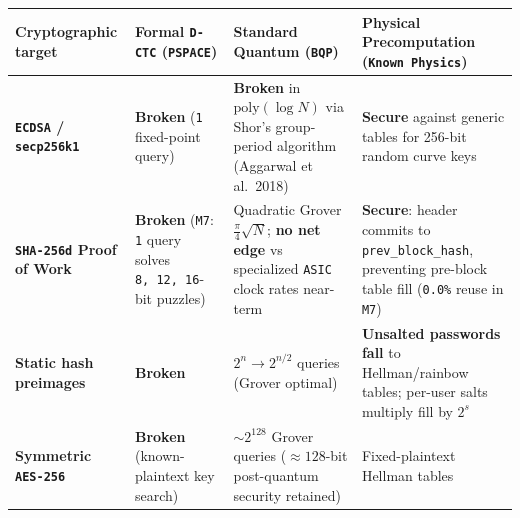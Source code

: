 \documentclass[10pt,letterpaper]{article}
\newcounter{none}
\begin{document}
{\def\LTcaptype{none} %
{\footnotesize\setlength{\tabcolsep}{3.8pt}\renewcommand{\arraystretch}{1.15}
\begin{longtable}[]{@{}
  >{\raggedright\arraybackslash}p{}
  >{\raggedright\arraybackslash}p{}
  >{\raggedright\arraybackslash}p{}
  >{\raggedright\arraybackslash}p{}@{}}
\toprule\noalign{}
\begin{minipage}[b]{\linewidth}\raggedright
\textbf{Cryptographic target}
\end{minipage} & \begin{minipage}[b]{\linewidth}\raggedright
\textbf{Formal \texttt{D-CTC} (\texttt{PSPACE})}
\end{minipage} & \begin{minipage}[b]{\linewidth}\raggedright
\textbf{Standard Quantum (\texttt{BQP})}
\end{minipage} & \begin{minipage}[b]{\linewidth}\raggedright
\textbf{Physical Precomputation (\texttt{Known\ Physics})}
\end{minipage} \\
\midrule\noalign{}
\endhead
\bottomrule\noalign{}
\endlastfoot
\textbf{\texttt{ECDSA} / \texttt{secp256k1}} & \textbf{Broken}
(\texttt{1} fixed-point query) & \textbf{Broken} in
\(\mathrm{poly}(\log N)\) via Shor's group-period algorithm (Aggarwal et
al.~2018) & \textbf{Secure} against generic tables for 256-bit random
curve keys \\
\textbf{\texttt{SHA-256d} Proof of Work} & \textbf{Broken} (\texttt{M7}:
\texttt{1} query solves \texttt{8,\allowbreak{}\ 12,\allowbreak{}\ 16}-bit puzzles) & Quadratic
Grover \(\frac{\pi}{4}\sqrt{N}\); \textbf{no net edge} vs specialized
\texttt{ASIC} clock rates near-term & \textbf{Secure}: header commits to
\texttt{prev\_\allowbreak{}block\_\allowbreak{}hash}, preventing pre-block table fill
(\texttt{0.0\%} reuse in \texttt{M7}) \\
\textbf{Static hash preimages} & \textbf{Broken} & \(2^n \to 2^{n/2}\)
queries (Grover optimal) & \textbf{Unsalted passwords fall} to
Hellman/rainbow tables; per-user salts multiply fill by \(2^s\) \\
\textbf{Symmetric \texttt{AES-256}} & \textbf{Broken} (known-plaintext
key search) & \(\sim 2^{128}\) Grover queries (\(\approx 128\)-bit
post-quantum security retained) & Fixed-plaintext Hellman tables

\end{longtable}}}
\end{document}
